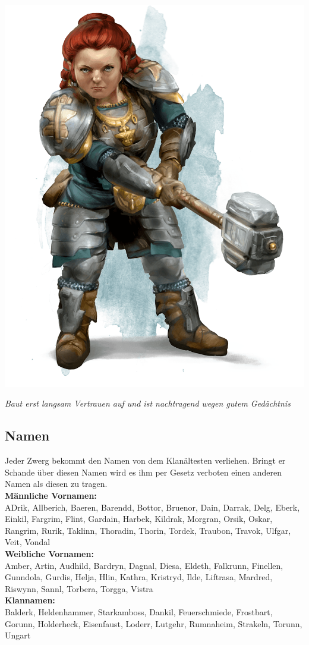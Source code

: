 \includegraphics[width=\textwidth / 3]{img/zwerg}

\textit{Baut erst langsam Vertrauen auf und ist nachtragend wegen gutem Gedächtnis}

\subsection*{Namen}
Jeder Zwerg bekommt den Namen von dem Klanältesten verliehen. Bringt er Schande über diesen Namen wird es ihm per Gesetz verboten einen anderen Namen als diesen zu tragen.\\
\textbf{Männliche Vornamen:}\\
ADrik, Allberich, Baeren, Barendd, Bottor, Bruenor, Dain, Darrak, Delg, Eberk, Einkil, Fargrim, Flint, Gardain, Harbek, Kildrak, Morgran, Orsik, Oskar, Rangrim, Rurik, Taklinn, Thoradin, Thorin, Tordek, Traubon, Travok, Ulfgar, Veit, Vondal
\\
\textbf{Weibliche Vornamen:}\\
Amber, Artin, Audhild, Bardryn, Dagnal, Diesa, Eldeth, Falkrunn, Finellen, Gunndola, Gurdis, Helja, Hlin, Kathra, Kristryd, Ilde, Liftrasa, Mardred, Riswynn, Sannl, Torbera, Torgga, Vistra\\
\textbf{Klannamen:}\\
Balderk, Heldenhammer, Starkamboss, Dankil, Feuerschmiede, Frostbart, Gorunn, Holderheck, Eisenfaust, Loderr, Lutgehr, Rumnaheim, Strakeln, Torunn, Ungart

